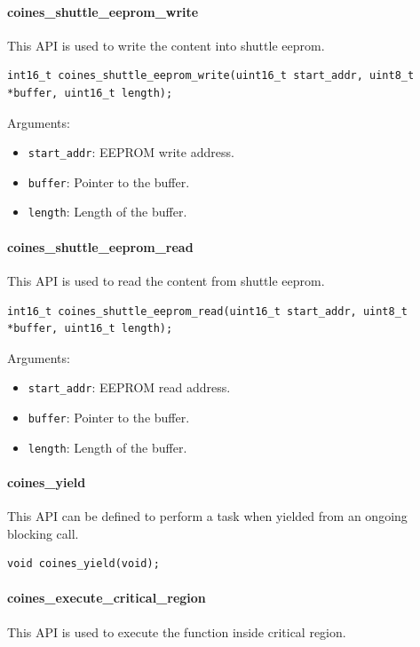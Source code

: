 \paragraph{coines\_shuttle\_eeprom\_write}
This API is used to write the content into shuttle eeprom.

\begin{lstlisting}
int16_t coines_shuttle_eeprom_write(uint16_t start_addr, uint8_t *buffer, uint16_t length);
\end{lstlisting}

Arguments:
\begin{itemize}
	\item \texttt{start\_addr}: EEPROM write address.
	\item \texttt{buffer}: Pointer to the buffer.
	\item \texttt{length}: Length of the buffer.
\end{itemize}

\paragraph{coines\_shuttle\_eeprom\_read}
This API is used to read the content from shuttle eeprom.

\begin{lstlisting}
int16_t coines_shuttle_eeprom_read(uint16_t start_addr, uint8_t *buffer, uint16_t length);
\end{lstlisting}

Arguments:
\begin{itemize}
	\item \texttt{start\_addr}: EEPROM read address.
	\item \texttt{buffer}: Pointer to the buffer.
	\item \texttt{length}: Length of the buffer.
\end{itemize}

\paragraph{coines\_yield}
This API can be defined to perform a task when yielded from an ongoing blocking call.

\begin{lstlisting}
void coines_yield(void);
\end{lstlisting}

\paragraph{coines\_execute\_critical\_region}
This API is used to execute the function inside critical region.

